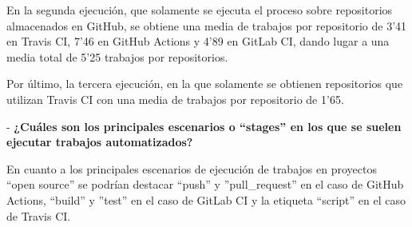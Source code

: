 En la segunda ejecución, que solamente se ejecuta el proceso sobre repositorios almacenados en GitHub, se obtiene una media de trabajos por repositorio de 3'41 en Travis CI, 7'46 en GitHub Actions y 4'89 en GitLab CI, dando lugar a una media total de 5'25 trabajos por repositorios.

Por último, la tercera ejecución, en la que solamente se obtienen repositorios que utilizan Travis CI con una media de trabajos por repositorio de 1'65.

- \textbf{¿Cuáles son los principales escenarios o ``stages'' en los que se suelen ejecutar trabajos automatizados?}

En cuanto a los principales escenarios de ejecución de trabajos en proyectos ``open source'' se podrían destacar ``push'' y ''pull\_request'' en el caso de GitHub Actions, ``build'' y ''test'' en el caso de GitLab CI y la etiqueta ``script'' en el caso de Travis CI.


